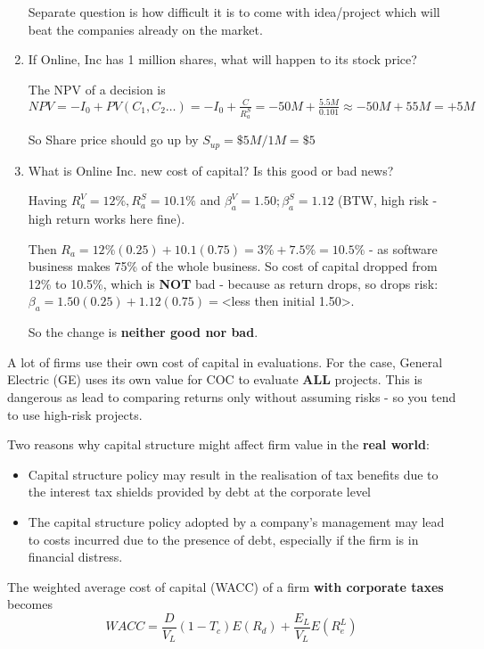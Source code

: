 \documentclass{scrartcl}
\begin{document}
\begin{enumerate}
Separate question is how difficult it is to come with idea/project which will
beat the companies already on the market. 

\item If Online, Inc has 1 million shares, what will happen to its stock price? 

The NPV of a decision is $NPV = -I_0 + PV(C_1, C_2 \dots) =-I_0 + \frac
C{R_a^S}= -50M + \frac{5.5M}{0.101} \approx -50M + 55M = +5M$

So Share price should go up by $S_{up} = \$5M/1M = \$5$

\item What is Online Inc. new cost of capital? Is this good or bad news?

Having $R_a^V = 12\%, R_a^S = 10.1\%$ and $\beta_a^V = 1.50; \beta_a^S = 1.12$
(BTW, high risk - high return works here fine).

Then $R_a = 12\%(0.25) + 10.1 (0.75) = 3\% + 7.5\% = 10.5\% $ - as software
business makes 75\% of the whole business. So cost of capital dropped from 12\%
to 10.5\%, which is {\bf NOT} bad - because as return drops, so drops risk:
$\beta_a = 1.50 (0.25) + 1.12 (0.75) = $<less then initial 1.50>.

So the change is {\bf neither good nor bad}.
\end{enumerate}

A lot of firms use their own cost of capital in evaluations. For the case,
General Electric (GE) uses its own value for COC to evaluate {\bf ALL} projects.
This is dangerous as lead to comparing returns only without assuming risks - so
you tend to use high-risk projects.

Two reasons why capital structure might affect firm value in the {\bf real
  world}: 
\begin{itemize}
\item Capital structure policy may result in the realisation of tax benefits due
  to the interest tax shields provided by debt at the corporate level


\item The capital structure policy adopted by a company's management may lead to
  costs incurred due to the presence of debt, especially if the firm is in
  financial distress.
\end{itemize}

The weighted average cost of capital (WACC) of a firm {\bf with corporate taxes}
becomes 
$$WACC = \frac D{V_L}(1-T_c)E(R_d) + \frac{E_L}{V_L} E(R_e^L) $$
\end{document}
